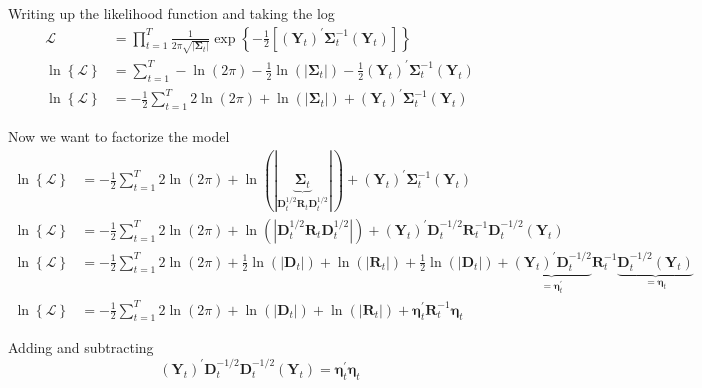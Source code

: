 \documentclass{article}
\begin{document}
Writing up the likelihood function and taking the log
\begin{align*}
\mathcal{L} & =\prod_{t=1}^{T}\frac{1}{2\pi\sqrt{|\boldsymbol{\Sigma}_{t}|}}\exp\left\{ -\frac{1}{2}\left[\left(\mathbf{Y}_{t}\right)^{\prime}\boldsymbol{\Sigma}_{t}^{-1}\left(\mathbf{Y}_{t}\right)\right]\right\} \\
\ln\left\{ \mathcal{L}\right\}  & =\sum_{t=1}^{T}-\ln\left(2\pi\right)-\frac{1}{2}\ln\left(|\boldsymbol{\Sigma}_{t}|\right)-\frac{1}{2}\left(\mathbf{Y}_{t}\right)^{\prime}\boldsymbol{\Sigma}_{t}^{-1}\left(\mathbf{Y}_{t}\right)\\
\ln\left\{ \mathcal{L}\right\}  & =-\frac{1}{2}\sum_{t=1}^{T}2\ln\left(2\pi\right)+\ln\left(|\boldsymbol{\Sigma}_{t}|\right)+\left(\mathbf{Y}_{t}\right)^{\prime}\boldsymbol{\Sigma}_{t}^{-1}\left(\mathbf{Y}_{t}\right)
\end{align*}

Now we want to factorize the model
\begin{align*}
\ln\left\{ \mathcal{L}\right\}  & =-\frac{1}{2}\sum_{t=1}^{T}2\ln\left(2\pi\right)+\ln\left(|\underbrace{\boldsymbol{\Sigma}_{t}}_{\mathbf{D}_{t}^{1/2}\mathbf{R}_{t}\mathbf{D}_{t}^{1/2}}|\right)+\left(\mathbf{Y}_{t}\right)^{\prime}\boldsymbol{\Sigma}_{t}^{-1}\left(\mathbf{Y}_{t}\right)\\
\ln\left\{ \mathcal{L}\right\}  & =-\frac{1}{2}\sum_{t=1}^{T}2\ln\left(2\pi\right)+\ln\left(\left\rvert\mathbf{D}_{t}^{1/2}\mathbf{R}_{t}\mathbf{D}_{t}^{1/2}\right\rvert\right)+\left(\mathbf{Y}_{t}\right)^{\prime}\mathbf{D}_{t}^{-1/2}\mathbf{R}_{t}^{-1}\mathbf{D}_{t}^{-1/2}\left(\mathbf{Y}_{t}\right)\\
\ln\left\{ \mathcal{L}\right\}  & =-\frac{1}{2}\sum_{t=1}^{T}2\ln\left(2\pi\right)+\frac{1}{2}\ln\left(\left\rvert \mathbf{D}_{t}\right\rvert \right)+\ln\left(\left\rvert \mathbf{R}_{t}\right\rvert \right)+\frac{1}{2}\ln\left(\left\rvert \mathbf{D}_{t}\right\rvert \right)+\underbrace{\left(\mathbf{Y}_{t}\right)^{\prime}\mathbf{D}_{t}^{-1/2}}_{=\boldsymbol{\eta}_{t}^{\prime}}\mathbf{R}_{t}^{-1}\underbrace{\mathbf{D}_{t}^{-1/2}\left(\mathbf{Y}_{t}\right)}_{=\boldsymbol{\eta}_{t}}\\
\ln\left\{ \mathcal{L}\right\}  & =-\frac{1}{2}\sum_{t=1}^{T}2\ln\left(2\pi\right)+\ln\left(\left\rvert \mathbf{D}_{t}\right\rvert \right)+\ln\left(\left\rvert \mathbf{R}_{t}\right\rvert \right)+\boldsymbol{\eta}_{t}^{\prime}\mathbf{R}_{t}^{-1}\boldsymbol{\eta}_{t}
\end{align*}

Adding and subtracting 
\[
\left(\mathbf{Y}_{t}\right)^{\prime}\mathbf{D}_{t}^{-1/2}\mathbf{D}_{t}^{-1/2}\left(\mathbf{Y}_{t}\right)=\boldsymbol{\eta}_{t}^{\prime}\boldsymbol{\eta}_{t}
\]
\end{document}

